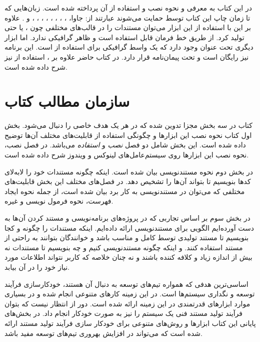 \begin{sloppypar}
در این کتاب به معرفی  و نحوه نصب و استفاده از آن پرداخته شده است. زبان‌هایی که تا زمان چاپ این کتاب 
توسط  حمایت می‌شوند عبارتند از: جاوا، 
، ، ، ، ، ، ، ،  و . 
علاوه بر این با استفاده از این ابزار می‌توان مستندات را در قالب‌های 
مختلفی چون ،  یا حتی \lr{\LaTeX} تولید کرد.  از طریق خط فرمان قابل استفاده است و 
ظاهر گرافیکی ندارد. اما ابزار دیگری تحت عنوان  وجود دارد که یک واسط گرافیکی 
برای استفاده از  است. این برنامه نیز رایگان است و تحت پیمان‌نامه  قرار دارد. در کتاب حاضر 
علاوه بر ، استفاده از  نیز شرح داده شده است.
\end{sloppypar}

\section{سازمان مطالب کتاب} 

کتاب در سه بخش مجزا تدوین شده که در هر یک هدف خاصی را دنبال می‌شود.
بخش اول کتاب نحوه نصب این ابزارها و چگونگی استفاده از قابلیت‌های مختلف آن‌ها
توضیح داده شده است.
این بخش شامل دو فصل \emph{نصب} و \emph{استفاده} می‌باشد. در فصل نصب، نحوه نصب
این ابزارها روی  سیستم‌عامل‌های لینوکس و ویندوز شرح داده شده است.

در بخش دوم نحوه مستندنویسی بیان شده است. اینکه چگونه مستندات خود را لابه‌لای
کدها بنویسیم تا  بتواند آن‌ها را تشخیص دهد. در فصل‌های مختلف این بخش
قابلیت‌های مختلفی که می‌توان در مستندنویسی به کار برد بیان شده است، از جمله نحوه
ایجاد فهرست، نحوه فرمول نویسی و غیره.

در بخش سوم بر اساس تجاربی که در پروژه‌های برنامه‌نویسی و مستند کردن آن‌ها به دست
آورده‌ایم الگویی برای مستندنویسی ارائه داده‌ایم. اینکه مستندات را چگونه و کجا
بنویسیم تا مستند تولیدی توسط  کامل و مناسب باشد و خوانندگان بتوانند
به راحتی از مستند استفاده کنند. و اینکه چگونه مستندنویسی کنیم و چه بنویسیم تا
مستندات نه بیش از اندازه زیاد و کلافه کننده باشند و نه چنان خلاصه که کاربر
نتواند اطلاعات مورد نیاز خود را در آن بیابد.

اساسی‌ترین هدفی که همواره تیم‌های توسعه به دنبال آن هستند، خودکارسازی فرآیند
توسعه و نگداری سیستم‌ها است. در این زمینه کارهای متنوعی انجام شده و در بسیاری
موارد ابزارهای قدرتمندی در این زمینه ارائه شده است. دور از انتظار نیست که بتوان
فرآیند تولید مستند فنی یک سیستم را نیز به صورت خودکار انجام داد. در بخش‌های
پایانی این کتاب ابزارها و روش‌های متنوعی برای خودکار سازی فرآیند تولید مستند
ارائه شده است که می‌تواند در افزایش بهروری تیم‌های توسعه مفید باشد.

